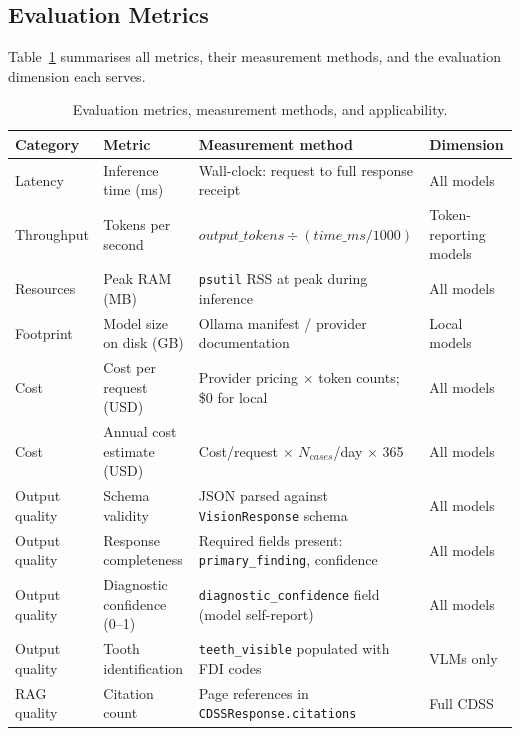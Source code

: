\documentclass[12pt,a4paper]{report}
\begin{document}
	\subsection{Evaluation Metrics}
	\label{subsec:metrics}
	
	Table~\ref{tab:metrics} summarises all metrics, their measurement
	methods, and the evaluation dimension each serves.
	
	\begin{table}[H]
		\centering
		\caption{Evaluation metrics, measurement methods, and applicability.}
		\label{tab:metrics}
		\small
		\renewcommand{\arraystretch}{1.2}
		\begin{tabularx}{\textwidth}{@{}l l X l@{}}
			\toprule
			\textbf{Category} & \textbf{Metric} & \textbf{Measurement method} & \textbf{Dimension} \\
			\midrule
			Latency       & Inference time (ms)          & Wall-clock: request to full response receipt                 & All models \\
			Throughput    & Tokens per second            & $\mathit{output\_tokens} \div (\mathit{time\_ms}/1000)$      & Token-reporting models \\
			Resources     & Peak RAM (MB)                & \texttt{psutil} RSS at peak during inference                 & All models \\
			Footprint     & Model size on disk (GB)      & Ollama manifest / provider documentation                     & Local models \\
			Cost          & Cost per request (USD)       & Provider pricing $\times$ token counts; \$0 for local        & All models \\
			Cost          & Annual cost estimate (USD)   & Cost/request $\times$ $N_{\mathit{cases}}$/day $\times$ 365  & All models \\
			Output quality & Schema validity             & JSON parsed against \texttt{VisionResponse} schema           & All models \\
			Output quality & Response completeness       & Required fields present: \texttt{primary\_finding}, confidence & All models \\
			Output quality & Diagnostic confidence (0--1)& \texttt{diagnostic\_confidence} field (model self-report)    & All models \\
			Output quality & Tooth identification         & \texttt{teeth\_visible} populated with FDI codes             & VLMs only \\
			RAG quality   & Citation count               & Page references in \texttt{CDSSResponse.citations}           & Full CDSS \\

\end{tabularx}
\end{table}
\end{document}
